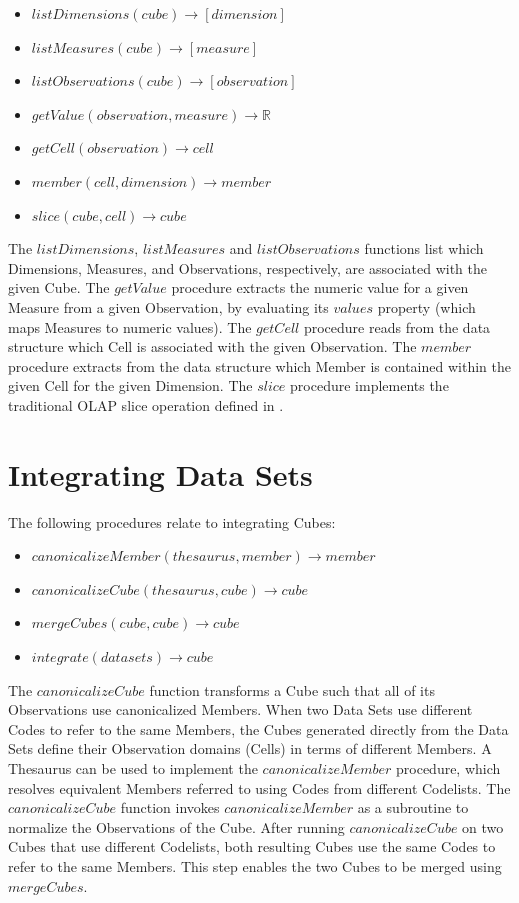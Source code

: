 \begin{itemize}
\item $listDimensions(cube) \rightarrow [dimension]$
\item $listMeasures(cube) \rightarrow [measure]$
\item $listObservations(cube) \rightarrow [observation]$
\item $getValue(observation, measure) \rightarrow \mathbb{R}$
\item $getCell(observation) \rightarrow cell$
\item $member(cell, dimension) \rightarrow member$
\item $slice(cube, cell) \rightarrow cube$
\end{itemize}

The $listDimensions$, $listMeasures$ and $listObservations$ functions list which Dimensions, Measures, and Observations, respectively, are associated with the given Cube. The $getValue$ procedure extracts the numeric value for a given Measure from a given Observation, by evaluating its $values$ property (which maps Measures to numeric values). The $getCell$ procedure reads from the data structure which Cell is associated with the given Observation. The $member$ procedure extracts from the data structure which Member is contained within the given Cell for the given Dimension. The $slice$ procedure implements the traditional OLAP slice operation defined in \cite{datta1999cube}. 

\section{Integrating Data Sets}

The following procedures relate to integrating Cubes:
\begin{itemize}
\item $canonicalizeMember(thesaurus, member) \rightarrow member$
\item $canonicalizeCube(thesaurus, cube) \rightarrow cube$
\item $mergeCubes(cube, cube) \rightarrow cube$
\item $integrate(datasets) \rightarrow cube$ 
\end{itemize}

The $canonicalizeCube$ function transforms a Cube such that all of its Observations use canonicalized Members. When two Data Sets use different Codes to refer to the same Members, the Cubes generated directly from the Data Sets define their Observation domains (Cells) in terms of different Members. A Thesaurus can be used to implement the $canonicalizeMember$ procedure, which resolves equivalent Members referred to using Codes from different Codelists. The $canonicalizeCube$ function invokes $canonicalizeMember$ as a subroutine to normalize the Observations of the Cube. After running $canonicalizeCube$ on two Cubes that use different Codelists, both resulting Cubes use the same Codes to refer to the same Members. This step enables the two Cubes to be merged using $mergeCubes$.


